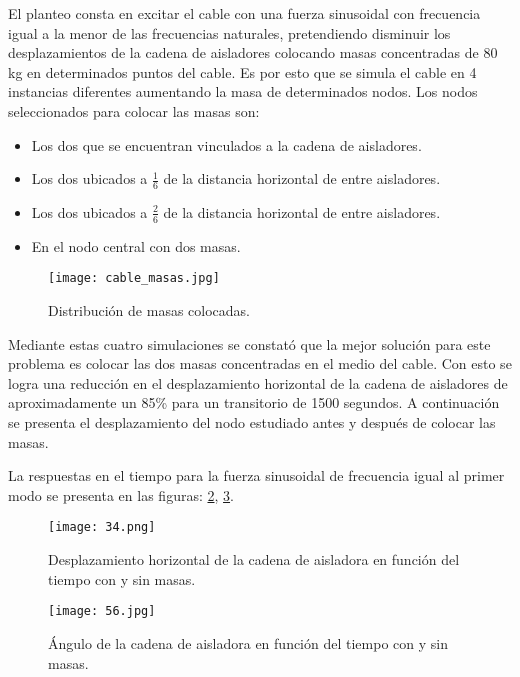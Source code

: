 El planteo consta en excitar el cable con una fuerza sinusoidal con frecuencia igual a la menor de las frecuencias naturales, pretendiendo disminuir los desplazamientos de la cadena de aisladores colocando masas concentradas de 80 kg en determinados puntos del cable. Es por esto que se simula el cable en 4 instancias diferentes aumentando la masa de determinados nodos. Los nodos seleccionados para colocar las masas son:
\begin{itemize}
	\item Los dos que se encuentran vinculados a la cadena de aisladores.
	\item Los dos ubicados a $\frac{1}{6}$ de la distancia horizontal de entre aisladores.
	\item Los dos ubicados a $\frac{2}{6}$ de la distancia horizontal de entre aisladores.
	\item En el nodo central con dos masas.
\end{itemize}





\begin{figure}[h]
	\centering
	\texttt{[image: cable\_masas.jpg]}
	\caption{Distribución de masas colocadas.}
	\label{masas}
\end{figure}




\newpage
Mediante estas cuatro simulaciones se constató que la mejor solución para este problema es colocar las dos masas concentradas en el medio del cable. Con esto se logra una reducción en el desplazamiento horizontal de la cadena de aisladores de aproximadamente un 85\% para un transitorio de 1500 segundos. A continuación se presenta el desplazamiento del nodo estudiado antes y después de colocar las masas.


La respuestas en el tiempo para la fuerza sinusoidal de frecuencia igual al primer modo se presenta en las figuras: \ref{desphorizsinm}, \ref{angulosinm}.

\begin{figure}[h]
	\centering
	\texttt{[image: 34.png]}
	\caption{Desplazamiento horizontal de la cadena de aisladora en función del tiempo con y sin masas.}
	\label{desphorizsinm}
\end{figure}

\begin{figure}[h]
	\centering
	\texttt{[image: 56.jpg]}
	\caption{Ángulo de la cadena de aisladora en función del tiempo con y sin masas.}
	\label{angulosinm}
\end{figure}






